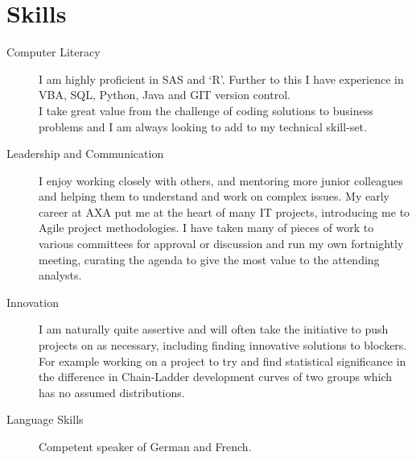 \documentclass[12pt]{article}
\begin{document}
\section*{Skills}
\begin{description}

\item[Computer Literacy] I am highly proficient in SAS and `R'. Further to this I have experience in VBA, SQL, Python, Java and GIT version control. \\
I take great value from the challenge of coding solutions to business problems and I am always looking to add to my technical skill-set. %

\item[Leadership and Communication] I enjoy working closely with others, and mentoring more junior colleagues and helping them to understand and work on complex issues. My early career at AXA put me at the heart of many IT projects, introducing me to Agile project methodologies. I have taken many of pieces of work to various committees for approval or discussion and run my own fortnightly meeting, curating the agenda to give the most value to the attending analysts.

\item[Innovation] I am naturally quite assertive and will often take the initiative to push projects on as necessary, including finding innovative solutions to blockers. For example working on a project to try and find statistical significance in the difference in Chain-Ladder development curves of two groups which has no assumed distributions.

\item[Language Skills] Competent speaker of German and French.



\end{description} 
\end{document}
